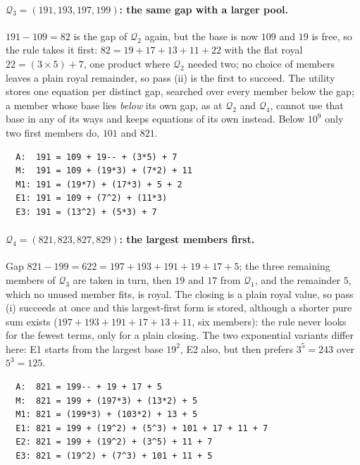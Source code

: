 \documentclass[11pt,a4paper]{article}
\newcommand{\Q}{\mathcal{Q}}
\begin{document}
\paragraph{$\Q_3=(191,193,197,199)$: the same gap with a larger pool.}
$191-109=82$ is the gap of $\Q_2$ again, but the base is now $109$ and
$19$ is free, so the rule takes it first: $82=19+17+13+11+22$ with the
flat royal $22=(3\times5)+7$, one product where $\Q_2$ needed two; no
choice of members leaves a plain royal remainder, so pass (ii) is the
first to succeed. The utility stores
one equation per distinct gap, searched over every member below the gap;
a member whose base lies \emph{below} its own gap, as at $\Q_2$ and
$\Q_4$, cannot use that base in any of its ways and keeps equations of its
own instead. Below $10^9$ only two first members do, $101$ and $821$.
\begin{small}\begin{verbatim}
  A:  191 = 109 + 19-- + (3*5) + 7
  M:  191 = 109 + (19*3) + (7*2) + 11
  M1: 191 = (19*7) + (17*3) + 5 + 2
  E1: 191 = 109 + (7^2) + (11*3)
  E3: 191 = (13^2) + (5*3) + 7
\end{verbatim}\end{small}

\paragraph{$\Q_4=(821,823,827,829)$: the largest members first.}
Gap $821-199=622=197+193+191+19+17+5$; the three remaining members of
$\Q_3$ are taken in turn, then $19$ and $17$ from $\Q_1$, and the
remainder $5$, which no unused member fits, is royal. The closing is a
plain royal value, so pass (i) succeeds at once and this largest-first
form is stored, although a shorter pure sum exists
($197+193+191+17+13+11$, six members): the rule never looks for the
fewest terms, only for a plain closing. The
two exponential variants differ here: E1 starts from the largest base
$19^2$, E2 also, but then prefers $3^5=243$ over $5^3=125$.
\begin{small}\begin{verbatim}
  A:  821 = 199-- + 19 + 17 + 5
  M:  821 = 199 + (197*3) + (13*2) + 5
  M1: 821 = (199*3) + (103*2) + 13 + 5
  E1: 821 = 199 + (19^2) + (5^3) + 101 + 17 + 11 + 7
  E2: 821 = 199 + (19^2) + (3^5) + 11 + 7
  E3: 821 = (19^2) + (7^3) + 101 + 11 + 5
\end{verbatim}\end{small}
\end{document}
